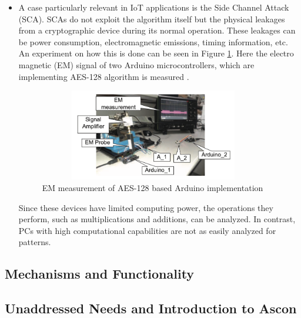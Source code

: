 \documentclass[a4paper,11pt, twoside]{article}
\begin{document}
\begin{itemize}
    \item A case particularly relevant in IoT applications is the Side Channel Attack (SCA). SCAs do not exploit the algorithm itself but the physical leakages from a cryptographic device during its normal operation. These leakages can be power consumption, electromagnetic emissions, timing information, etc. An experiment on how this is done can be seen in Figure \ref{fig:em_measurment}. Here the electro magnetic (EM) signal of two Arduino microcontrollers, which are implementing AES-128 algorithm is measured \cite{pammu2016interceptive}.
    
        \begin{figure}[h]
            \centering
            \includegraphics[width=10cm, height=4cm]{media/em_measurment.png}
            \caption{EM measurement of AES-128 based Arduino implementation}
            \label{fig:em_measurment}
        \end{figure}

    Since these devices have limited computing power, the operations they perform, such as multiplications and additions, can be analyzed. In contrast, PCs with high computational capabilities are not as easily analyzed for patterns.
    \end{itemize}



\subsection{Mechanisms and Functionality}   %


\subsection{Unaddressed Needs and Introduction to Ascon}   %





\end{document}
